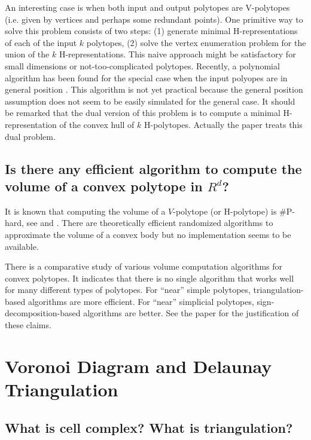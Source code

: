 \documentclass[[a4paper,12pt]{article}
\begin{document}
An interesting case is when both input and output polytopes
are V-polytopes (i.e. given by vertices and perhaps some
redundant points).   One primitive way to solve this problem
consists of two steps: (1) generate minimal H-representations
of each of the input $k$ polytopes, (2) solve the vertex
enumeration problem for the union of
the $k$ H-representations.  This naive approach might be
satisfactory for small dimensions or not-too-complicated polytopes.
Recently, a polynomial  algorithm has been found for the special
case when the input polyopes are in general position \cite{fll-ech-00}.
This algorithm is not yet practical because the general
position assumption does not seem to be easily simulated 
for the general case.  It should be remarked that the dual
version of this problem is to compute a minimal H-representation
of the convex hull of $k$ H-polytopes.  Actually the paper \cite{fll-ech-00}
treats this dual problem.

\subsection{Is there any efficient algorithm to compute
the volume of a convex polytope in $R^d$?}
\label{polytope:volume}

It is known that computing the volume of a $V$-polytope
(or H-polytope) is \#P-hard, see \cite{df-tccvp-88}
and \cite{k-cpvc-93}.   There are theoretically efficient randomized algorithms
to approximate the volume of a convex body \cite{ls-rwcbi-93}
but no implementation seems to be available.

There is a comparative study \cite{bef-cevcm-00} of various 
volume computation algorithms
for convex polytopes.  It indicates that there is no single
algorithm that works well for many different types of polytopes.
For ``near'' simple polytopes, triangulation-based algorithms are
more efficient. For ``near'' simplicial polytopes, sign-decomposition-based
algorithms are better.   See the paper for the justification of
these claims.


\section{Voronoi Diagram and Delaunay Triangulation} \label{Sec:voronoi}

\subsection{What is cell complex?  What is triangulation?}
\label{voronoi:complex}
\end{document}
